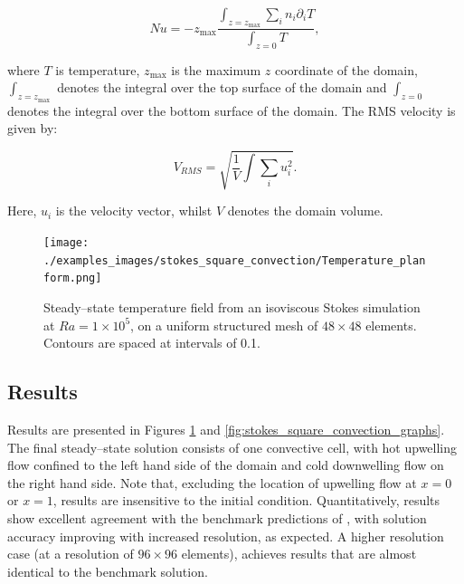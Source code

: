 \begin{equation}
Nu = -z_{\max}\frac{\int_{z=z_{\max}} \sum_{i} n_{i} \partial_{i} T}{\int_{z=0} T},
\end{equation}

\medskip \noindent where $T$ is temperature, $z_{\max}$ is the maximum $z$ coordinate of the domain, $\int_{z=z_{\max}}$ denotes the integral over the top surface of the domain and $\int_{z=0}$ denotes the integral over the bottom surface of the domain.  The RMS velocity is given by:

\begin{equation}
V_{RMS} = \sqrt{\frac{1}{V}{\int \sum_i u_{i}^{2}}}.
\end{equation}

\medskip \noindent Here, $u_{i}$ is the velocity vector, whilst $V$ denotes the domain volume. 

\begin{figure}[t]
	\centering
	      \texttt{[image: ./examples\_images/stokes\_square\_convection/Temperature\_planform.png]}
   \caption{Steady--state temperature field from an isoviscous Stokes simulation at $Ra = 1 \times 10^{5}$, on a uniform structured mesh of $48 \times 48$ elements. Contours are spaced at intervals of 0.1.}
   \label{fig:stokes_square_convection_planform}
\end{figure}

\subsection{Results}

Results are presented in Figures \ref{fig:stokes_square_convection_planform} and \ref{fig:stokes_square_convection_graphs}. The final steady--state solution consists of one convective cell, with hot upwelling flow confined to the left hand side of the domain and cold downwelling flow on the right hand side. Note that, excluding the location of upwelling flow at $x=0$ or $x=1$, results are insensitive to the initial condition. Quantitatively, results show excellent agreement with the benchmark predictions of \citet{blankenbach1989}, with solution accuracy improving with increased resolution, as expected. A higher resolution case (at a resolution of $96 \times 96$ elements), achieves results that are almost identical to the benchmark solution.

